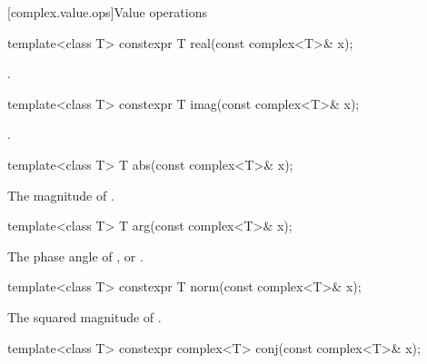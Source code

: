 [complex.value.ops]{Value operations}

%
\begin{itemdecl}
template<class T> constexpr T real(const complex<T>& x);
\end{itemdecl}

\begin{itemdescr}
\pnum
\returns
{}.
\end{itemdescr}

%
\begin{itemdecl}
template<class T> constexpr T imag(const complex<T>& x);
\end{itemdecl}

\begin{itemdescr}
\pnum
\returns
{}.
\end{itemdescr}

%
\begin{itemdecl}
template<class T> T abs(const complex<T>& x);
\end{itemdecl}

\begin{itemdescr}
\pnum
\returns
The magnitude of .
\end{itemdescr}

%
\begin{itemdecl}
template<class T> T arg(const complex<T>& x);
\end{itemdecl}

\begin{itemdescr}
\pnum
\returns
The phase angle of , or .
\end{itemdescr}

%
\begin{itemdecl}
template<class T> constexpr T norm(const complex<T>& x);
\end{itemdecl}

\begin{itemdescr}
\pnum
\returns
The squared magnitude of .
\end{itemdescr}

%
\begin{itemdecl}
template<class T> constexpr complex<T> conj(const complex<T>& x);
\end{itemdecl}


